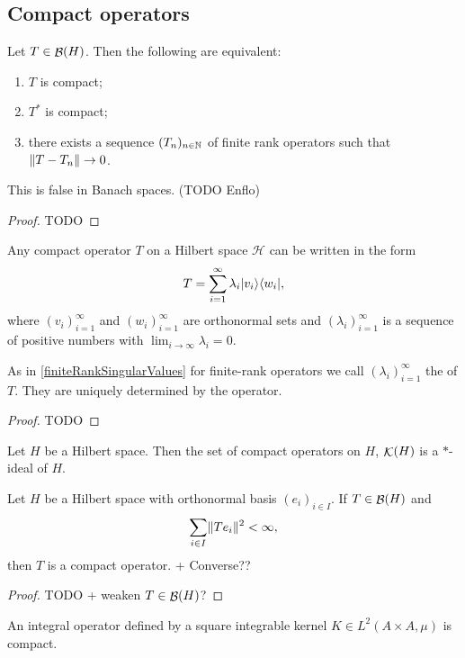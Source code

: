 \subsection{Compact operators}
\begin{proposition}
Let $T\in\mathop{\mathcal{B}}(H)$. Then the following are equivalent:
\begin{enumerate}
\item $T$ is compact;
\item $T^*$ is compact;
\item there exists a sequence $(T_n)_{n\in\mathbb{N}}$ of finite rank operators such that $\lVert T-T_n\rVert\to 0$.
\end{enumerate}
\end{proposition}
This is false in Banach spaces. (TODO Enflo)
\begin{proof}
TODO
\end{proof}
\begin{corollary}
Any compact operator $T$ on a Hilbert space $\mathcal{H}$ can be written in the form
\[ T = \sum_{i=1}^\infty \lambda_i |v_i\rangle\langle w_i|, \]
where $(v_i)_{i=1}^\infty$ and $(w_i)_{i=1}^\infty$ are orthonormal sets and $(\lambda_i)_{i=1}^\infty$ is a sequence of positive numbers with $\lim_{i\to\infty}\lambda_i = 0$.
\end{corollary}
As in \ref{finiteRankSingularValues} for finite-rank operators we call $(\lambda_i)_{i=1}^\infty$ the  of $T$. They are uniquely determined by the operator.
\begin{proof}
TODO
\end{proof}

\begin{lemma}
Let $H$ be a Hilbert space. Then the set of compact operators on $H$, $\mathop{\mathcal{K}}(H)$ is a $*$-ideal of $H$. 
\end{lemma}

\begin{proposition}
Let $H$ be a Hilbert space with orthonormal basis $(e_i)_{i\in I}$. If $T\in\mathop{\mathcal{B}}(H)$ and
\[ \sum_{i\in I}\lVert Te_i\rVert^2  < \infty, \]
then $T$ is a compact operator. + Converse??
\end{proposition}
\begin{proof}
TODO + weaken $T\in\mathop{\mathcal{B}}(H)$?
\end{proof}
\begin{corollary}
An integral operator defined by a square integrable kernel $K\in L^2(A\times A, \mu)$ is compact.
\end{corollary}

